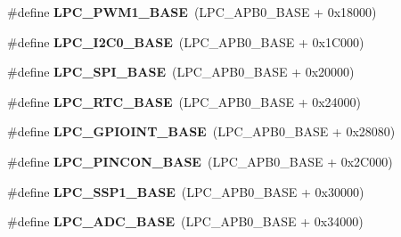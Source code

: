 \begin{DoxyCompactItemize}
\item 
\hypertarget{group___l_p_c17xx___system_gabb885bd92b4a003b94dc27c4700818bb}{\#define {\bfseries \-L\-P\-C\-\_\-\-P\-W\-M1\-\_\-\-B\-A\-S\-E}~(\-L\-P\-C\-\_\-\-A\-P\-B0\-\_\-\-B\-A\-S\-E + 0x18000)}\label{group___l_p_c17xx___system_gabb885bd92b4a003b94dc27c4700818bb}

\item 
\hypertarget{group___l_p_c17xx___system_gab4476c9e874621194369f74fcf26ce92}{\#define {\bfseries \-L\-P\-C\-\_\-\-I2\-C0\-\_\-\-B\-A\-S\-E}~(\-L\-P\-C\-\_\-\-A\-P\-B0\-\_\-\-B\-A\-S\-E + 0x1\-C000)}\label{group___l_p_c17xx___system_gab4476c9e874621194369f74fcf26ce92}

\item 
\hypertarget{group___l_p_c17xx___system_gaf611188188574ba805b6de71acc88c6c}{\#define {\bfseries \-L\-P\-C\-\_\-\-S\-P\-I\-\_\-\-B\-A\-S\-E}~(\-L\-P\-C\-\_\-\-A\-P\-B0\-\_\-\-B\-A\-S\-E + 0x20000)}\label{group___l_p_c17xx___system_gaf611188188574ba805b6de71acc88c6c}

\item 
\hypertarget{group___l_p_c17xx___system_ga4618213cf968f8245814d7d3e7aa2e2e}{\#define {\bfseries \-L\-P\-C\-\_\-\-R\-T\-C\-\_\-\-B\-A\-S\-E}~(\-L\-P\-C\-\_\-\-A\-P\-B0\-\_\-\-B\-A\-S\-E + 0x24000)}\label{group___l_p_c17xx___system_ga4618213cf968f8245814d7d3e7aa2e2e}

\item 
\hypertarget{group___l_p_c17xx___system_gadf88491f4b83b5af99eaf30778cb62fa}{\#define {\bfseries \-L\-P\-C\-\_\-\-G\-P\-I\-O\-I\-N\-T\-\_\-\-B\-A\-S\-E}~(\-L\-P\-C\-\_\-\-A\-P\-B0\-\_\-\-B\-A\-S\-E + 0x28080)}\label{group___l_p_c17xx___system_gadf88491f4b83b5af99eaf30778cb62fa}

\item 
\hypertarget{group___l_p_c17xx___system_gaf4bd6baff731c0a23231ad37e133d705}{\#define {\bfseries \-L\-P\-C\-\_\-\-P\-I\-N\-C\-O\-N\-\_\-\-B\-A\-S\-E}~(\-L\-P\-C\-\_\-\-A\-P\-B0\-\_\-\-B\-A\-S\-E + 0x2\-C000)}\label{group___l_p_c17xx___system_gaf4bd6baff731c0a23231ad37e133d705}

\item 
\hypertarget{group___l_p_c17xx___system_ga05d118997f53f596d3a087f8b91a1969}{\#define {\bfseries \-L\-P\-C\-\_\-\-S\-S\-P1\-\_\-\-B\-A\-S\-E}~(\-L\-P\-C\-\_\-\-A\-P\-B0\-\_\-\-B\-A\-S\-E + 0x30000)}\label{group___l_p_c17xx___system_ga05d118997f53f596d3a087f8b91a1969}

\item 
\hypertarget{group___l_p_c17xx___system_ga2396e0d0c565e4c1c3b2fc593bd6c37f}{\#define {\bfseries \-L\-P\-C\-\_\-\-A\-D\-C\-\_\-\-B\-A\-S\-E}~(\-L\-P\-C\-\_\-\-A\-P\-B0\-\_\-\-B\-A\-S\-E + 0x34000)}\label{group___l_p_c17xx___system_ga2396e0d0c565e4c1c3b2fc593bd6c37f}


\end{DoxyCompactItemize}
